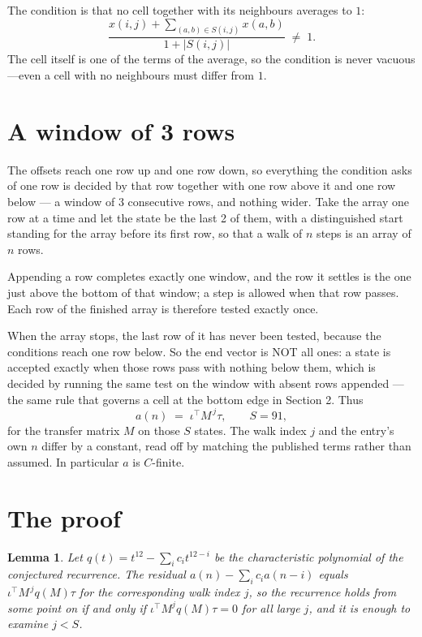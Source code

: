 \documentclass[11pt,a4paper]{article}
\theoremstyle{plain}
\newtheorem{lemma}[theorem]{Lemma}
\theoremstyle{definition}
\begin{document}
The condition is that no cell together with its neighbours averages to $1$:
\[
\frac{x(i,j)+\sum_{(a,b)\in S(i,j)}x(a,b)}{1+|S(i,j)|}\;\neq\;1 .
\]
The cell itself is one of the terms of the average, so the condition is never vacuous---even a cell with no neighbours must differ from $1$.

\section{A window of 3 rows}

The offsets reach one row up and one row down, so everything the condition asks of one row is
decided by that row together with one row above it and one row below --- a window of
$3$ consecutive rows, and nothing wider. Take the array one row at a time
and let the state be the last 2 of them, with a distinguished start standing for the
array before its first row, so that a walk of $n$ steps is an array of $n$ rows.

Appending a row completes exactly one window, and the row it settles is the one just above the bottom of that window; a step is
allowed when that row passes. Each row of the finished
array is therefore tested exactly once.

When the array stops, the last row of it has never been tested, because the
conditions reach one row below. So the end vector is NOT all ones: a state is accepted exactly when
those rows pass with nothing below them, which is decided by running the same test on the window
with absent rows appended --- the same rule that governs a cell at the bottom edge in
Section 2.
Thus
\[
a(n)\;=\;\iota^{\!\top}M^{\,j}\tau ,\qquad S=91,
\]
for the transfer matrix $M$ on those $S$ states. The walk index $j$ and the entry's own $n$
differ by a constant, read off by matching the published terms rather than assumed. In
particular $a$ is $C$-finite.

\section{The proof}

\begin{lemma}\label{lem:crit}
Let $q(t)=t^{12}-\sum_i c_it^{12-i}$ be the characteristic polynomial of the
conjectured recurrence. The residual $a(n)-\sum_ic_ia(n-i)$ equals
$\iota^{\!\top}M^{\,j}q(M)\tau$ for the corresponding walk index $j$, so the recurrence
holds from some point on if and only if $\iota^{\!\top}M^{j}q(M)\tau=0$ for all large $j$,
and it is enough to examine $j<S$.
\end{lemma}
\end{document}
